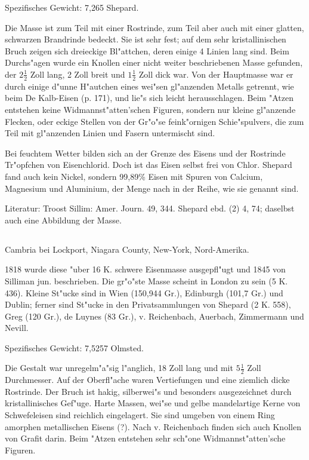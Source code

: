 \documentclass[a4paper, 11pt, oneside]{article}
\begin{document}
Spezifisches Gewicht: 7,265 Shepard.

Die Masse ist zum Teil mit einer Rostrinde, zum Teil aber auch mit einer glatten, schwarzen Brandrinde bedeckt. Sie ist sehr fest; auf dem sehr kristallinischen Bruch zeigen sich dreieckige Bl"attchen, deren einige 4 Linien lang sind. Beim Durchs"agen wurde ein Knollen einer nicht weiter beschriebenen Masse gefunden, der $\mathfrak{2\frac{1}{2}}$ Zoll lang, 2 Zoll breit und $\mathfrak{1\frac{1}{2}}$ Zoll dick war. Von der Hauptmasse war er durch einige d"unne H"autchen eines wei"sen gl"anzenden Metalls getrennt, wie beim De Kalb-Eisen (p. 171), und lie"s sich leicht herausschlagen. Beim "Atzen entstehen keine Widmannst"atten'schen Figuren, sondern nur kleine gl"anzende Flecken, oder eckige Stellen von der Gr"o"se feink"ornigen Schie"spulvers, die zum Teil mit gl"anzenden Linien und Fasern untermischt sind.

Bei feuchtem Wetter bilden sich an der Grenze des Eisens und der Rostrinde Tr"opfchen von Eisenchlorid. Doch ist das Eisen selbst frei von Chlor. Shepard fand auch kein Nickel, sondern 99,89\% Eisen mit Spuren von Calcium, Magnesium und Aluminium, der Menge nach in der Reihe, wie sie genannt sind.

\normalsize
Literatur: Troost Sillim: Amer. Journ. 49, 344. Shepard ebd. (2) 4, 74; daselbst auch eine Abbildung der Masse.

\subsection{}
\LARGE
\paragraph{}
Cambria bei Lockport, Niagara County, New-York, Nord-Amerika.

1818 wurde diese "uber 16 K. schwere Eisenmasse ausgepfl"ugt und 1845 von Silliman jun. beschrieben. Die gr"o"ste Masse scheint in London zu sein (5 K. 436). Kleine St"ucke sind in Wien (150,944 Gr.), Edinburgh (101,7 Gr.) und Dublin; ferner sind St"ucke in den Privatsammlungen von Shepard (2 K. 558), Greg (120 Gr.), de Luynes (83 Gr.), v. Reichenbach, Auerbach, Zimmermann und Nevill.

Spezifisches Gewicht: 7,5257 Olmsted.

Die Gestalt war unregelm"a"sig l"anglich, 18 Zoll lang und mit $\mathfrak{5\frac{1}{2}}$ Zoll Durchmesser. Auf der Oberfl"ache waren Vertiefungen und eine ziemlich dicke Rostrinde. Der Bruch ist hakig, silberwei"s und besonders ausgezeichnet durch kristallinisches Gef"uge. Harte Massen, wei"se und gelbe mandelartige Kerne von Schwefeleisen sind reichlich eingelagert. Sie sind umgeben von einem Ring amorphen metallischen Eisens (?). Nach v. Reichenbach finden sich auch Knollen von Grafit darin. Beim "Atzen entstehen sehr sch"one Widmannst"atten'sche Figuren.
\end{document}
